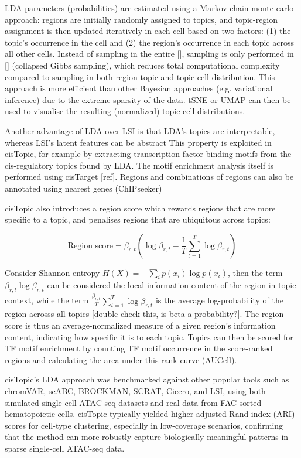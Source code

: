 LDA parameters (probabilities) are estimated using a Markov chain monte carlo approach: regions are initially randomly assigned to topics, and topic-region assignment is then updated iteratively in each cell based on two factors: (1) the topic's occurrence in the cell and (2) the region's occurrence in each topic across all other cells. Instead of sampling in the entire [], sampling is only performed in [] (collapsed Gibbs sampling), which reduces total computational complexity compared to sampling in both region-topic and topic-cell distribution. This approach is more efficient than other Bayesian approaches (e.g. variational inference) due to the extreme sparsity of the data. tSNE or UMAP can then be used to visualise the resulting (normalized) topic-cell distributions.

Another advantage of LDA over LSI is that LDA's topics are interpretable, whereas LSI's latent features can be abstract This property is exploited in cisTopic, for example by extracting transcription factor binding motifs from the cis-regulatory topics found by LDA. The motif enrichment analysis itself is performed using cisTarget [ref]. Regions and combinations of regions can also be annotated using nearest genes (ChIPseeker)

cisTopic also introduces a region score which rewards regions that are more specific to a topic, and penalises regions that are ubiquitous across topics:

\[
	\text{Region score} = \beta_{r,t} \left( \log \beta_{r,t} - \frac{1}{T} \sum_{t=1}^{T} \log \beta_{r,t} \right)
\]

Consider Shannon entropy $H(X) = -\sum_{i} p(x_i) \log p(x_i)$, then the term \(\beta_{r,t} \log \beta_{r,t}\) can be considered the local information content of the region in topic context, while the term \(\frac{\beta_{r,t}}{T} \sum_{t=1}^{T} \log \beta_{r,t}\) is the average log-probability of the region acrosss all topics [double check this, is beta a probability?]. The region score is thus an average-normalized measure of a given region's information content, indicating how specific it is to each topic. Topics can then be scored for TF motif enrichment by counting TF motif occurrence in the score-ranked regions and calculating the area under this rank curve (AUCell).

cisTopic's LDA approach was benchmarked against other popular tools such as chromVAR, scABC, BROCKMAN, SCRAT, Cicero, and LSI, using both simulated single-cell ATAC-seq datasets and real data from FAC-sorted hematopoietic cells. cisTopic typically yielded higher adjusted Rand index (ARI) scores for cell-type clustering, especially in low-coverage scenarios, confirming that the method can more robustly capture biologically meaningful patterns in sparse single-cell ATAC-seq data.

